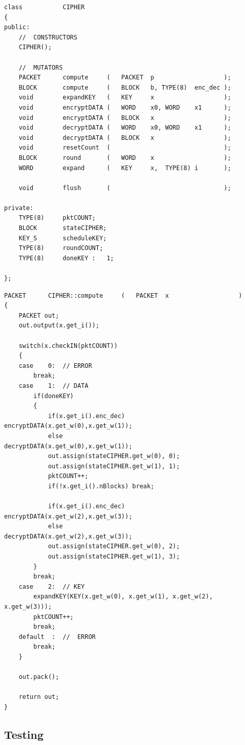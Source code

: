 \documentclass[12pt,twoside,a4paper]{report}
\begin{document}
 	\begin{minipage}{\linewidth}
	\begin{lstlisting}[label={lst:CIPHER_CLASS},caption={The declaration of the CIPHER Class},style=CStyle]	   	
class			CIPHER
{
public:
	//	CONSTRUCTORS
	CIPHER();
	
	//	MUTATORS
	PACKET		compute		(	PACKET	p					);
	BLOCK		compute		(	BLOCK	b, TYPE(8)	enc_dec	);
	void		expandKEY	(	KEY		x					);
	void		encryptDATA	(	WORD	x0,	WORD	x1		);
	void		encryptDATA	(	BLOCK	x					);
	void		decryptDATA	(	WORD	x0,	WORD	x1		);
	void		decryptDATA	(	BLOCK	x					);
	void		resetCount	(								);
	BLOCK		round		(	WORD	x					);
	WORD		expand		(	KEY		x,	TYPE(8)	i		);
	
	void		flush		(								);
	
private:
	TYPE(8)		pktCOUNT;
	BLOCK		stateCIPHER;
	KEY_S		scheduleKEY;
	TYPE(8)		roundCOUNT;
	TYPE(8)		doneKEY	:	1;
	
};
	\end{lstlisting}
	\end{minipage}

 	\begin{minipage}{\linewidth}
	\begin{lstlisting}[label={lst:compute_PACKET},caption={The function for handling the packets},style=CStyle]	
PACKET		CIPHER::compute		(	PACKET	x					)
{
	PACKET out;
	out.output(x.get_i());
	
	switch(x.checkIN(pktCOUNT))
	{
	case	0:	// ERROR
		break;
	case	1:	// DATA
		if(doneKEY)
		{
			if(x.get_i().enc_dec)	encryptDATA(x.get_w(0),x.get_w(1));
			else					decryptDATA(x.get_w(0),x.get_w(1));
			out.assign(stateCIPHER.get_w(0), 0);
			out.assign(stateCIPHER.get_w(1), 1);
			pktCOUNT++;
			if(!x.get_i().nBlocks) break;
				
			if(x.get_i().enc_dec)	encryptDATA(x.get_w(2),x.get_w(3));
			else					decryptDATA(x.get_w(2),x.get_w(3));
			out.assign(stateCIPHER.get_w(0), 2);
			out.assign(stateCIPHER.get_w(1), 3);
		}
		break;
	case	2:	// KEY
		expandKEY(KEY(x.get_w(0), x.get_w(1), x.get_w(2), x.get_w(3)));
		pktCOUNT++;
		break;
	default	 :	//	ERROR
		break;
	}
	
	out.pack();
	
	return out;
}
	\end{lstlisting}
	\end{minipage}
    
    \subsection{Testing}
	
\end{document}
